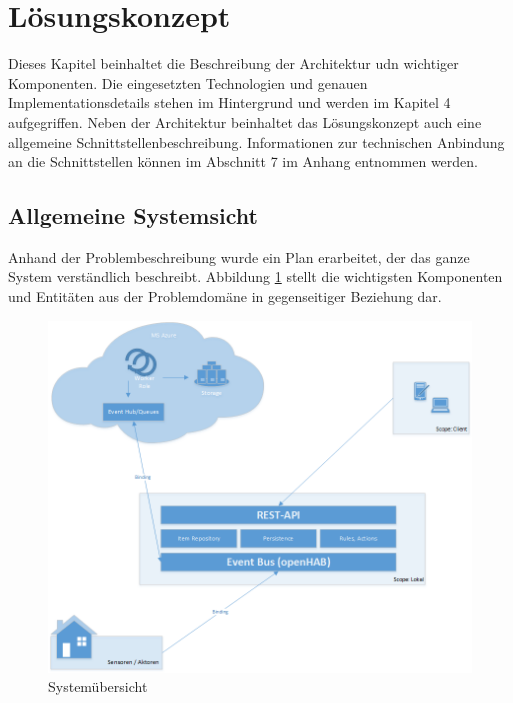 \section{Lösungskonzept}
Dieses Kapitel beinhaltet die Beschreibung der Architektur udn wichtiger Komponenten. Die eingesetzten Technologien und genauen Implementationsdetails stehen im Hintergrund und werden im Kapitel 4 aufgegriffen. Neben der Architektur beinhaltet das Lösungskonzept auch eine allgemeine Schnittstellenbeschreibung. Informationen zur technischen Anbindung an die Schnittstellen können im Abschnitt 7 \tbd im Anhang entnommen werden.

\subsection{Allgemeine Systemsicht}
Anhand der Problembeschreibung wurde ein Plan erarbeitet, der das ganze System verständlich beschreibt. Abbildung \ref{fig:systemView} stellt die wichtigsten Komponenten und Entitäten aus der Problemdomäne in gegenseitiger Beziehung dar.

\begin{figure}[h!]
	\centering
		\includegraphics[scale=0.55]{report/img/systemuebersicht}
	\caption{Systemübersicht}
	\label{fig:systemView}
\end{figure}